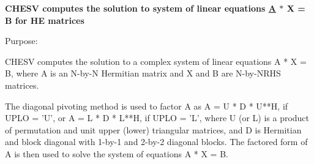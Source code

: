 {\bfseries  C\+H\+E\+S\+V computes the solution to system of linear equations \hyperlink{classA}{A} $\ast$ X = B for H\+E matrices} 

 \begin{DoxyParagraph}{Purpose\+: }
\begin{DoxyVerb} CHESV computes the solution to a complex system of linear equations
    A * X = B,
 where A is an N-by-N Hermitian matrix and X and B are N-by-NRHS
 matrices.

 The diagonal pivoting method is used to factor A as
    A = U * D * U**H,  if UPLO = 'U', or
    A = L * D * L**H,  if UPLO = 'L',
 where U (or L) is a product of permutation and unit upper (lower)
 triangular matrices, and D is Hermitian and block diagonal with
 1-by-1 and 2-by-2 diagonal blocks.  The factored form of A is then
 used to solve the system of equations A * X = B.\end{DoxyVerb}
 
\end{DoxyParagraph}

